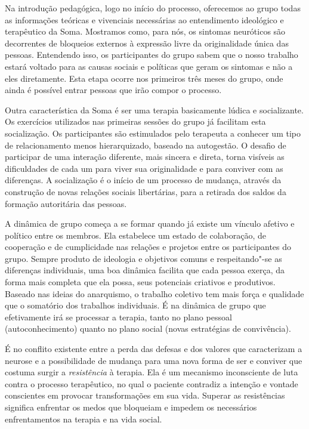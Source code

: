 Na introdução pedagógica, logo no início do processo, oferecemos ao
grupo todas as informações teóricas e vivenciais necessárias ao
entendimento ideológico e terapêutico da Soma. Mostramos como, para nós,
os sintomas neuróticos são decorrentes de bloqueios externos à expressão
livre da originalidade única das pessoas. Entendendo isso, os
participantes do grupo sabem que o nosso trabalho estará voltado para as
causas sociais e políticas que geram os sintomas e não a eles
diretamente. Esta etapa ocorre nos primeiros três meses do grupo, onde
ainda é possível entrar pessoas que irão compor o processo.

Outra característica da Soma é ser uma terapia basicamente lúdica e
socializante. Os exercícios utilizados nas primeiras sessões do grupo já
facilitam esta socialização. Os participantes são estimulados pelo
terapeuta a conhecer um tipo de relacionamento menos hierarquizado,
baseado na autogestão. O desafio de participar de uma interação
diferente, mais sincera e direta, torna visíveis as dificuldades de cada
um para viver sua originalidade e para conviver com as diferenças. A
socialização é o início de um processo de mudança, através da construção
de novas relações sociais libertárias, para a retirada dos saldos da
formação autoritária das pessoas.

A dinâmica de grupo começa a se formar quando já existe um vínculo
afetivo e político entre os membros. Ela estabelece um estado de
colaboração, de cooperação e de cumplicidade nas relações e projetos
entre os participantes do grupo. Sempre produto de ideologia e objetivos
comuns e respeitando"-se as diferenças individuais, uma boa dinâmica
facilita que cada pessoa exerça, da forma mais completa que ela possa,
seus potenciais criativos e produtivos. Baseado nas ideias do
anarquismo, o trabalho coletivo tem mais força e qualidade que o
somatório dos trabalhos individuais. É na dinâmica de grupo que
efetivamente irá se processar a terapia, tanto no plano pessoal
(autoconhecimento) quanto no plano social (novas estratégias de
convivência).

É no conflito existente entre a perda das defesas e dos valores que
caracterizam a neurose e a possibilidade de mudança para uma nova forma
de ser e conviver que costuma surgir a \emph{resistência} à terapia. Ela
é um mecanismo inconsciente de luta contra o processo terapêutico, no
qual o paciente contradiz a intenção e vontade conscientes em provocar
transformações em sua vida. Superar as resistências significa enfrentar
os medos que bloqueiam e impedem os necessários enfrentamentos na
terapia e na vida social.

